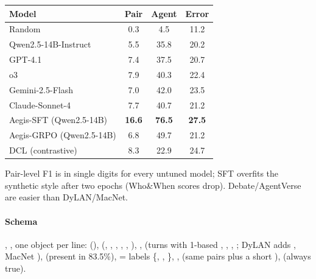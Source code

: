 \begin{center}\small
\begin{tabular}{@{}lccc@{}}\toprule
Model & Pair & Agent & Error\\\midrule
Random & 0.3 & 4.5 & 11.2\\
Qwen2.5-14B-Instruct & 5.5 & 35.8 & 20.2\\
GPT-4.1 & 7.4 & 37.5 & 20.7\\
o3 & 7.9 & 40.3 & 22.4\\
Gemini-2.5-Flash & 7.0 & 42.0 & 23.5\\
Claude-Sonnet-4 & 7.7 & 40.7 & 21.2\\
Aegis-SFT (Qwen2.5-14B) & \textbf{16.6} & \textbf{76.5} & \textbf{27.5}\\
Aegis-GRPO (Qwen2.5-14B) & 6.8 & 49.7 & 21.2\\
DCL (contrastive) & 8.3 & 22.9 & 24.7\\\bottomrule
\end{tabular}
\end{center}
Pair-level F1 is in single digits for every untuned model; SFT overfits the synthetic style after two epochs (Who\&When scores drop). Debate/AgentVerse are easier than DyLAN/MacNet.

\paragraph{Schema} , , one object per line:  (\allowbreak{}),  (, , , , , ), ,  (turns with 1-based , , , ; DyLAN adds , MacNet ),  (present in 83.5\%),  = labels \{, , \}, ,  (same pairs plus a short ),  (always true).

